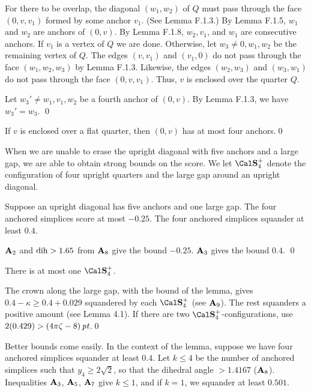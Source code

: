   For there to be overlap, the diagonal $(w_1,w_2)$
of $Q$ must pass through the face $(0,v,v_1)$ formed by
some anchor $v_1$.  (See Lemma F.1.3.)  By Lemma
F.1.5, $w_1$ and $w_2$ are
anchors of $(0,v)$.  By Lemma F.1.8, $w_2,v_1$, and $w_1$ are consecutive anchors.
If $v_1$ is a vertex of $Q$ we are done.  
Otherwise, let $w_3\ne 0,w_1,w_2$ be the remaining vertex of $Q$.
The edges $(v,v_1)$
and $(v_1,0)$ do not pass through the face $(w_1,w_2,w_3)$ by
Lemma F.1.3.  
Likewise, the edges $(w_2,w_3)$ and $(w_3,w_1)$ do not pass through the
face $(0,v,v_1)$.  Thus, $v$ is enclosed over the quarter $Q$.


Let $w_3'\ne w_1,v_1,w_2$ be a fourth anchor of $(0,v)$.
By Lemma F.1.3, we have $w_3'=w_3$.
\qed
\enddemo

  If $v$ is enclosed over a
flat quarter, then $(0,v)$ has at most four anchors.\qed
\endproclaim

When we are unable to erase the upright diagonal with
five anchors and a 
large gap, we are able to obtain strong bounds on
the score.  We let $\Sfour$ denote the configuration of four
upright quarters and the large gap around an upright diagonal.

  Suppose an upright diagonal has five anchors and
one large gap. The four anchored simplices score at most $-0.25$.
The four anchored simplices squander
at least $0.4$.
\endproclaim

${\bold A}_2$ and  $\operatorname{dih}>1.65$ from ${\bold A}_8$ give the bound $-0.25$.
${\bold A}_3$ gives the bound $0.4$.
\qed
\enddemo

  There is at most one $\Sfour$.
\endproclaim

  The crown along the large gap, with the
bound of the lemma, gives
	$0.4-\kappa \ge 0.4+0.029$
squandered by each $\Sfour$ (see ${\bold A}_9$).  The rest squanders
a positive amount (see Lemma 4.1).  If there are two $\Sfour$-configurations,
use $2(0.429)>(4\pi\zeta-8)\,\hbox{\it pt}$.\qed\enddemo

Better bounds come easily.  In the context
of the lemma,  suppose we have 
four anchored simplices squander at least $0.4$.  Let $k\le 4$
be the number of anchored simplices such that $y_4\ge 2\sqrt{2}$,
so that the dihedral angle $>1.4167$ (${\bold A}_8$).  Inequalities ${\bold A}_3$,
${\bold A}_5$, ${\bold A}_7$ give $k\le1$, and if $k=1$, we squander at least $0.501$.


